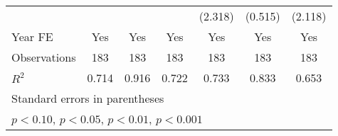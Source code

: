 \begin{table}[htbp]
\begin{tabular}{l*{6}{c}}
                &                  &                  &                  &  (2.318)         &  (0.515)         &  (2.118)         \\
\addlinespace
Year FE         &      Yes         &      Yes         &      Yes         &      Yes         &      Yes         &      Yes         \\
\midrule
Observations    &      183         &      183         &      183         &      183         &      183         &      183         \\
\(R^{2}\)       &    0.714         &    0.916         &    0.722         &    0.733         &    0.833         &    0.653         \\
\bottomrule
\multicolumn{7}{l}{\footnotesize Standard errors in parentheses}\\
\multicolumn{7}{l}{\footnotesize \sym{+} \(p<0.10\), \sym{*} \(p<0.05\), \sym{**} \(p<0.01\), \sym{***} \(p<0.001\)}\\
\end{tabular}
\end{table}
